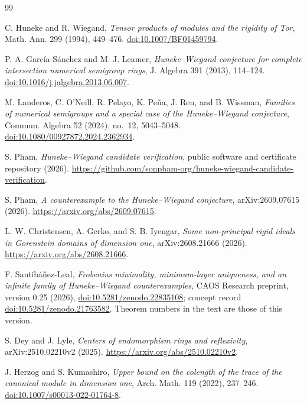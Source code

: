 \documentclass[11pt]{article}
\theoremstyle{definition}
\theoremstyle{remark}
\begin{document}
{\footnotesize
\begin{thebibliography}{99}
\setlength{\itemsep}{0.25em}
\setlength{\parsep}{0pt}

C. Huneke and R. Wiegand,
\emph{Tensor products of modules and the rigidity of Tor},
Math. Ann. 299 (1994), 449--476.
\href{https://doi.org/10.1007/BF01459794}{doi:10.1007/BF01459794}.

P. A. Garc\'ia-S\'anchez and M. J. Leamer,
\emph{Huneke--Wiegand conjecture for complete intersection numerical semigroup rings},
J. Algebra 391 (2013), 114--124.
\href{https://doi.org/10.1016/j.jalgebra.2013.06.007}{doi:10.1016/j.jalgebra.2013.06.007}.

M. Landeros, C. O'Neill, R. Pelayo, K. Pe\~na, J. Ren, and B. Wissman,
\emph{Families of numerical semigroups and a special case of the Huneke--Wiegand conjecture},
Commun. Algebra 52 (2024), no.~12, 5043--5048.
\href{https://doi.org/10.1080/00927872.2024.2362934}{doi:10.1080/00927872.2024.2362934}.

S. Pham,
\emph{Huneke--Wiegand candidate verification}, public software and certificate repository (2026).
\url{https://github.com/sonpham-org/huneke-wiegand-candidate-verification}.

S. Pham,
\emph{A counterexample to the Huneke--Wiegand conjecture}, arXiv:2609.07615 (2026).
\url{https://arxiv.org/abs/2609.07615}.

L. W. Christensen, A. Gerko, and S. B. Iyengar,
\emph{Some non-principal rigid ideals in Gorenstein domains of dimension one},
arXiv:2608.21666 (2026).
\url{https://arxiv.org/abs/2608.21666}.

F. Santib\'a\~nez-Leal,
\emph{Frobenius minimality, minimum-layer uniqueness, and an infinite family of
Huneke--Wiegand counterexamples}, CAOS Research preprint, version 0.25 (2026),
\href{https://doi.org/10.5281/zenodo.22835108}{doi:10.5281/zenodo.22835108}; concept record
\href{https://doi.org/10.5281/zenodo.21763582}{doi:10.5281/zenodo.21763582}.
Theorem numbers in the text are those of this version.

S. Dey and J. Lyle,
\emph{Centers of endomorphism rings and reflexivity},
arXiv:2510.02210v2 (2025).
\url{https://arxiv.org/abs/2510.02210v2}.

J. Herzog and S. Kumashiro,
\emph{Upper bound on the colength of the trace of the canonical module in dimension one},
Arch. Math. 119 (2022), 237--246.
\href{https://doi.org/10.1007/s00013-022-01764-8}{doi:10.1007/s00013-022-01764-8}.


\end{thebibliography}}
\end{document}
